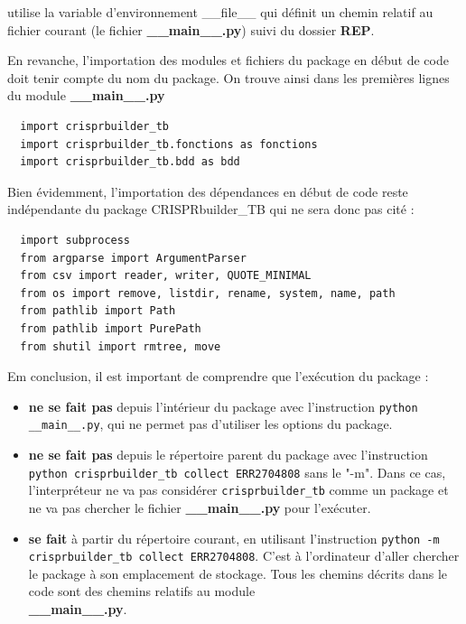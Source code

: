\documentclass[twoside,a4paper,11pt,frenchb,openany]{report}
\begin{document}
utilise la variable d'environnement \_\_file\_\_ qui définit un chemin relatif au fichier courant (le fichier \textbf{\_\_main\_\_.py}) suivi du dossier \textbf{REP}.

En revanche, l'importation des modules et fichiers du package en début de code doit tenir compte du nom du package. On trouve ainsi dans les premières lignes du module \textbf{\_\_main\_\_.py}

\begin{verbatim}
  import crisprbuilder_tb
  import crisprbuilder_tb.fonctions as fonctions
  import crisprbuilder_tb.bdd as bdd
\end{verbatim}

Bien évidemment, l'importation des dépendances en début de code reste indépendante du package CRISPRbuilder\_TB qui ne sera donc pas cité :

\begin{verbatim}
  import subprocess 
  from argparse import ArgumentParser
  from csv import reader, writer, QUOTE_MINIMAL
  from os import remove, listdir, rename, system, name, path
  from pathlib import Path 
  from pathlib import PurePath
  from shutil import rmtree, move
\end{verbatim}

Em conclusion, il est important de comprendre que l'exécution du package :
\begin{itemize}
\item \textbf{ne se fait pas} depuis l'intérieur du package avec l'instruction \texttt{python \_\_main\_\_.py}, qui ne permet pas d'utiliser les options du package.
\item \textbf{ne se fait pas} depuis le répertoire parent du package avec l'instruction \\\texttt{python crisprbuilder\_tb \textemdash \textemdash collect ERR2704808} sans le "-m". Dans ce cas, l'interpréteur ne va pas considérer \texttt{crisprbuilder\_tb} comme un package et ne va pas chercher le fichier \textbf{\_\_main\_\_.py} pour l'exécuter.
\item \textbf{se fait} à partir du répertoire courant, en utilisant l'instruction \texttt{python -m crisprbuilder\_tb \textemdash \textemdash collect ERR2704808}. C'est à l'ordinateur d'aller chercher le package à son emplacement de stockage. Tous les chemins décrits dans le code sont des chemins relatifs au module \\\textbf{\_\_main\_\_.py}.
\end{itemize}
\end{document}
